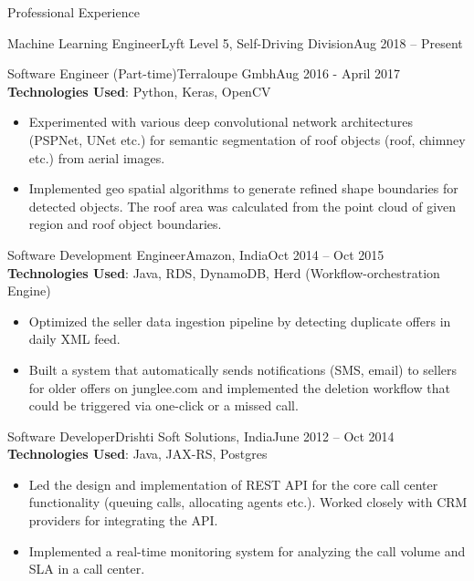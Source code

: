 \documentclass[]{mcdowellcv}
\begin{document}
\begin{cvsection}{Professional Experience}
\begin{cvsubsection}{Machine Learning Engineer}{Lyft Level 5, Self-Driving Division}{Aug 2018 -- Present}
		\end{cvsubsection}
		
		
		\begin{cvsubsection}{Software Engineer (Part-time)}{Terraloupe Gmbh}{Aug 2016 - April 2017}
			\textbf{Technologies Used}: Python, Keras, OpenCV
			\begin{itemize}
				\item Experimented with various deep convolutional network architectures (PSPNet, UNet etc.) for semantic segmentation of roof objects (roof, chimney etc.) from aerial images.
				\item Implemented geo spatial algorithms to generate refined shape boundaries for detected objects. The roof area was calculated from the point cloud of given region and roof object boundaries.
			\end{itemize}
		\end{cvsubsection}
		
		
		\begin{cvsubsection}{Software Development Engineer}{Amazon, India}{Oct 2014 -- Oct 2015}  
			\textbf{Technologies Used}: Java, RDS, DynamoDB, Herd (Workflow-orchestration Engine)
			\begin{itemize}
				\item Optimized the seller data ingestion pipeline by detecting duplicate offers in daily XML feed.
				\item Built a system that automatically sends notifications (SMS, email) to sellers for older offers on junglee.com and implemented the deletion
				workflow that could be triggered via one-click or a missed call.
			\end{itemize}
		\end{cvsubsection}
		
		\begin{cvsubsection}{Software Developer}{Drishti Soft Solutions, India}{June 2012 -- Oct 2014}
			\textbf{Technologies Used}: Java, JAX-RS, Postgres
			\begin{itemize} 
				\item Led the design and implementation of REST API for the core call center functionality (queuing calls, allocating agents etc.). Worked closely with CRM providers for integrating the API.  
				\item Implemented a real-time monitoring system for analyzing the call volume and SLA in a call center. 
			\end{itemize}
		\end{cvsubsection}
	\end{cvsection}
	
\end{document}
